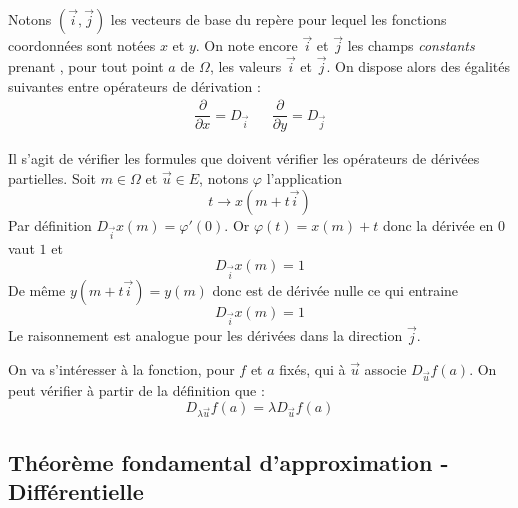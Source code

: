 \begin{prop}
 Notons  $(\overrightarrow i , \overrightarrow j )$ les vecteurs de base du repère pour lequel les fonctions coordonnées sont notées $x$ et $y$. On note encore $\overrightarrow i$ et $\overrightarrow j$ les champs \emph{constants} prenant , pour tout point $a$ de $\Omega$, les valeurs $\overrightarrow i$ et $\overrightarrow j$. On dispose alors des égalités suivantes entre opérateurs de dérivation :
\begin{align*}
 \dfrac{\partial}{\partial x} = D_{\overrightarrow i} & & \dfrac{\partial}{\partial y} = D_{\overrightarrow j} 
\end{align*}
\end{prop}
\begin{demo}
 Il s'agit de vérifier les formules que doivent vérifier les opérateurs de dérivées partielles.\newline
Soit $m\in \Omega$ et $\overrightarrow u \in E$, notons $\varphi$ l'application
\begin{displaymath}
 t \rightarrow x(m+t\overrightarrow i)
\end{displaymath}
Par définition $D_{\overrightarrow i}x(m) = \varphi '(0)$. Or $\varphi(t)=x(m) + t$ donc la dérivée en $0$ vaut $1$ et
\begin{displaymath}
 D_{\overrightarrow i}x(m) = 1
\end{displaymath}
De même $y(m+t\overrightarrow i)=y(m)$ donc est de dérivée nulle ce qui entraine
\begin{displaymath}
 D_{\overrightarrow i}x(m) = 1
\end{displaymath}
Le raisonnement est analogue pour les dérivées dans la direction $\overrightarrow j$.
\end{demo}
On va s'intéresser à la fonction, pour $f$ et $a$ fixés, qui à $\overrightarrow u$ associe $D_{\overrightarrow u}f(a)$. On peut vérifier à partir de la définition que :
\begin{displaymath}
 D_{\lambda \overrightarrow u}f(a) = \lambda D_{\overrightarrow u}f(a)
\end{displaymath}
 
\subsection{Théorème fondamental d'approximation - Différentielle}
